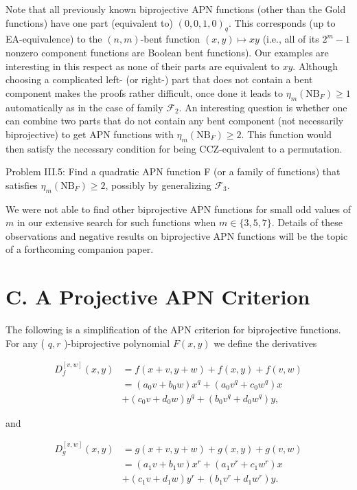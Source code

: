 \documentclass[10pt]{article}
\begin{document}
Note that all previously known biprojective APN functions (other than the Gold functions) have one part (equivalent to) $(0,0,1,0)_{q}$. This corresponds (up to EA-equivalence) to the $(n, m)$-bent function $(x, y) \mapsto x y$ (i.e., all of its $2^{m}-1$ nonzero component functions are Boolean bent functions). Our examples are interesting in this respect as none of their parts are equivalent to $x y$. Although choosing a complicated left- (or right-) part that does not contain a bent component makes the proofs rather difficult, once done it leads to $\eta_{m}\left(\mathrm{NB}_{F}\right) \geq 1$ automatically as in the case of family $\mathcal{F}_{2}$. An interesting question is whether one can combine two parts that do not contain any bent component (not necessarily biprojective) to get APN functions with $\eta_{m}\left(\mathrm{NB}_{F}\right) \geq 2$. This function would then satisfy the necessary condition for being CCZ-equivalent to a permutation.

Problem III.5: Find a quadratic APN function F (or a family of functions) that satisfies $\eta_{m}\left(\mathrm{NB}_{F}\right) \geq 2$, possibly by generalizing $\mathcal{F}_{3}$.

We were not able to find other biprojective APN functions for small odd values of $m$ in our extensive search for such functions when $m \in\{3,5,7\}$. Details of these observations and negative results on biprojective APN functions will be the topic of a forthcoming companion paper.

\section*{C. A Projective APN Criterion}
The following is a simplification of the APN criterion for biprojective functions. For any ( $q, r$ )-biprojective polynomial $F(x, y)$ we define the derivatives

$$
\begin{aligned}
D_{f}^{[v, w]}(x, y) & =f(x+v, y+w)+f(x, y)+f(v, w) \\
& =\left(a_{0} v+b_{0} w\right) x^{q}+\left(a_{0} v^{q}+c_{0} w^{q}\right) x \\
& +\left(c_{0} v+d_{0} w\right) y^{q}+\left(b_{0} v^{q}+d_{0} w^{q}\right) y,
\end{aligned}
$$

and

$$
\begin{aligned}
D_{g}^{[v, w]}(x, y) & =g(x+v, y+w)+g(x, y)+g(v, w) \\
& =\left(a_{1} v+b_{1} w\right) x^{r}+\left(a_{1} v^{r}+c_{1} w^{r}\right) x \\
& +\left(c_{1} v+d_{1} w\right) y^{r}+\left(b_{1} v^{r}+d_{1} w^{r}\right) y .
\end{aligned}
$$
\end{document}
